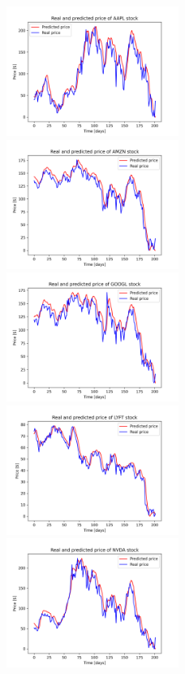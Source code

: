 \begin{figure}
\includegraphics[width=0.5\textwidth]{./graf/model5/AAPL.png}
\includegraphics[width=0.5\textwidth]{./graf/model5/AMZN.png}
\includegraphics[width=0.5\textwidth]{./graf/model5/GOOGL.png}
\includegraphics[width=0.5\textwidth]{./graf/model5/LYFT.png}
\includegraphics[width=0.5\textwidth]{./graf/model5/NVDA.png}

\end{figure}
